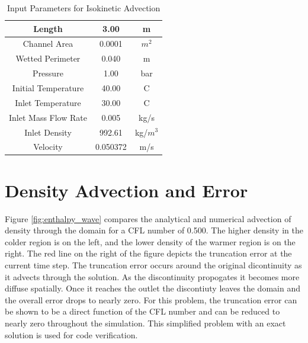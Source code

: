     \begin{table}[!h]
    	\center
    	\label{table:Advection_Params}
    	\caption{Input Parameters for Isokinetic Advection}
    	\begin{tabular}{|c|c|c|}
    		\hline
	    	Length 	  				&  3.00		& m 		\\ \hline 
	    	Channel Area			&  0.0001	& $m^{2}$	\\ \hline
	    	Wetted Perimeter		&  0.040	& m			\\ \hline
	    	Pressure  				&  1.00		& bar		\\ \hline
	    	Initial Temperature		&  40.00	& C			\\ \hline
	    	Inlet Temperature		&  30.00 	& C			\\ \hline
	    	Inlet Mass Flow Rate 	&  0.005	& kg/s		\\ \hline 
	    	Inlet Density			&  992.61	& kg/$m^{3}$\\ \hline
	    	Velocity				&  0.050372	& m/s		\\ \hline
    	\end{tabular}
    \end{table}
    
    \section{Density Advection and Error}
    
    Figure \ref{fig:enthalpy_wave} compares the analytical and numerical
    advection of density through the domain for a CFL number of 0.500. The
    higher density in the colder region is on the left, and the lower density of
    the warmer region is on the right. The red line on the right of the figure
    depicts the truncation error at the current time step. The truncation error
    occurs around the original dicontinuity as it advects through the solution.
    As the discontinuity propogates it becomes more diffuse spatially. Once it
    reaches the outlet the discontiuty leaves the domain and the overall error
    drops to nearly zero. For this problem, the truncation error can be shown to
    be a direct function of the CFL number and can be reduced to nearly zero
    throughout the simulation. This simplified problem with an exact solution is
    used for code verification.
    
